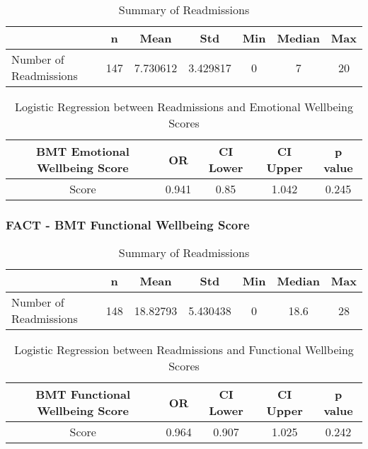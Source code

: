 \documentclass[12pt,]{article}
\begin{document}
\begin{table}[!h]

\caption{\label{tab:unnamed-chunk-33}Summary of Readmissions}
\centering
\begin{tabular}{>{\raggedright\arraybackslash}p{5cm}cccccc}
\toprule
  & n & Mean & Std & Min & Median & Max\\
\midrule
\rowcolor{white}  Number of Readmissions & 147 & 7.730612 & 3.429817 & 0 & 7 & 20\\
\bottomrule
\end{tabular}
\end{table}

\begin{table}[!h]

\caption{\label{tab:unnamed-chunk-33}Logistic Regression between Readmissions and Emotional Wellbeing Scores}
\centering
\begin{tabular}{ccccc}
\toprule
BMT Emotional Wellbeing Score & OR & CI Lower & CI Upper & p value\\
\midrule
\rowcolor{white}  Score & 0.941 & 0.85 & 1.042 & 0.245\\
\bottomrule
\end{tabular}
\end{table}

\pagebreak

\subsubsection{FACT - BMT Functional Wellbeing
Score}\label{fact---bmt-functional-wellbeing-score}

\begin{table}[!h]

\caption{\label{tab:unnamed-chunk-34}Summary of Readmissions}
\centering
\begin{tabular}{>{\raggedright\arraybackslash}p{5cm}cccccc}
\toprule
  & n & Mean & Std & Min & Median & Max\\
\midrule
\rowcolor{white}  Number of Readmissions & 148 & 18.82793 & 5.430438 & 0 & 18.6 & 28\\
\bottomrule
\end{tabular}
\end{table}

\begin{table}[!h]

\caption{\label{tab:unnamed-chunk-34}Logistic Regression between Readmissions and Functional Wellbeing Scores}
\centering
\begin{tabular}{ccccc}
\toprule
BMT Functional Wellbeing Score & OR & CI Lower & CI Upper & p value\\
\midrule
\rowcolor{white}  Score & 0.964 & 0.907 & 1.025 & 0.242\\
\bottomrule
\end{tabular}
\end{table}
\end{document}

